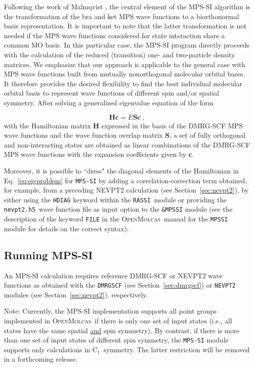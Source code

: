 \documentclass[bibliography=totoc,12pt,a4paper]{scrartcl}
\newcommand{\mol}{\textsc{OpenMolcas}}
\newcommand{\hostp}{\mol}
\newcommand{\kwd}[1]{\texttt{#1}}
\begin{document}
Following the work of Malmqvist \cite{malm86}, the central element of the MPS-SI algorithm is the transformation of the bra and ket MPS wave functions to a biorthonormal basis representation.
It is important to note that the latter transformation is not needed if the MPS wave functions considered for state interaction
share a common MO basis. In this particular case, the MPS-SI program directly proceeds with the calculation of the reduced (transition) one- and two-particle density matrices.
We emphasize that our approach is applicable to the general case with MPS wave functions built from mutually nonorthogonal molecular orbital bases.
It therefore provides the desired flexibility to find the best individual molecular orbital basis to represent wave functions of different spin and/or spatial symmetry.
After solving a generalized eigenvalue equation of the form

\begin{equation}
  {\textbf{Hc}} = E {\textbf{Sc}}\ ,
  \label{eq:eigproblem}
\end{equation}
%
with the Hamiltonian matrix \textbf{H} expressed in the basis of the DMRG-SCF MPS wave functions and the wave function overlap matrix \textbf{S}, a set of fully orthogonal and non-interacting states are obtained as linear combinations of the DMRG-SCF MPS wave functions with the expansion coefficients given by \textbf{c}.

Moreover, it is possible to ``dress" the diagonal elements of the Hamiltonian in Eq.~\eqref{eq:eigproblem} for \kwd{MPS-SI} by adding a correlation-correction term obtained, for example, from a preceding NEVPT2 calculation (see Section~\ref{sec:nevpt2}), by either using the \texttt{HDIAG} keyword within the \kwd{RASSI}\ module or providing the \texttt{nevpt2.h5}\ wave function file as input option to the \kwd{\&MPSSI} module (see the description of the keyword \kwd{FILE} in the \hostp\ manual for the \kwd{MPSSI} module for details on the correct syntax).

\subsection{Running MPS-SI}
\label{sec:run-mpssi}

An MPS-SI calculation requires reference DMRG-SCF or NEVPT2 wave functions as obtained with the \kwd{DMRGSCF} (see Section~\ref{sec:dmrgscf}) or \kwd{NEVPT2} modules (see Section~\ref{sec:nevpt2}), respectively.

\begin{framed}
 \noindent Note: Currently, the MPS-SI implementation supports all point groups implemented in \hostp\ if there is only one set of input states (i.e., all states have the same spatial \underline{and} spin symmetry).
 By contrast, if there is more than one set of input states of different spin symmetry, the \kwd{MPS-SI} module supports only calculations in C$_1$\ symmetry. The latter restriction will be removed in a forthcoming release.
\end{framed}
\end{document}
